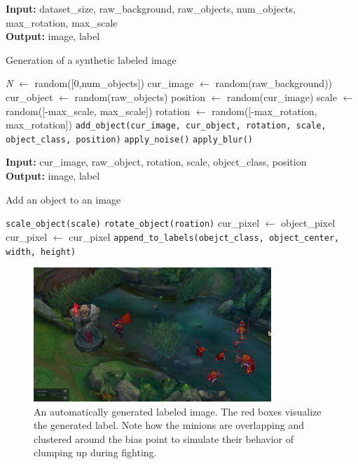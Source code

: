 \begin{algorithm}
\hspace*{\algorithmicindent} \textbf{Input:} dataset\_size, raw\_background, raw\_objects, num\_objects, max\_rotation, max\_scale\\
\hspace*{\algorithmicindent} \textbf{Output:} image, label
\begin{algorithmic}[1]
\caption{Generation of a synthetic labeled image}
\label{alg:1}
\State \textit{N} $\gets$ random([0,num\_objects])
\State cur\_image $\gets$ random(raw\_background))
	\State cur\_object $\gets$ random(raw\_objects)
	\State position $\gets$ random(cur\_image)
	\State scale $\gets$ random([-max\_scale, max\_scale])
	\State rotation $\gets$ random([-max\_rotation, max\_rotation])
	\State \texttt{add\_object(cur\_image, cur\_object, rotation, scale, object\_class, position)}
	\EndFor
\State \texttt{apply\_noise()}
\State \texttt{apply\_blur()}
\EndFor
\EndFunction
\end{algorithmic}
\end{algorithm}

\begin{algorithm}
\hspace*{\algorithmicindent} \textbf{Input:} cur\_image, raw\_object, rotation, scale, object\_class, position
\\
\hspace*{\algorithmicindent} \textbf{Output:} image, label
\begin{algorithmic}[1]
\caption{Add an object to an image}
\label{alg:2}
\State \texttt{scale\_object(scale)}
\State \texttt{rotate\_object(roation)}
	\State cur\_pixel $\gets$ object\_pixel
	\Else
	\State cur\_pixel $\gets$ cur\_pixel
	\EndIf
\EndFor
\State \texttt{append\_to\_labels(obejct\_class, object\_center, width, height)}
\EndFunction
\end{algorithmic}
\end{algorithm}

\begin{figure}[t]
\centering
\includegraphics[width=0.8\textwidth]{figures/example.jpg}
\caption{An automatically generated labeled image. The red boxes visualize the generated label. Note how the minions are overlapping and clustered around the bias point to simulate their behavior of clumping up during fighting.}
\label{fig:example}
\end{figure}

